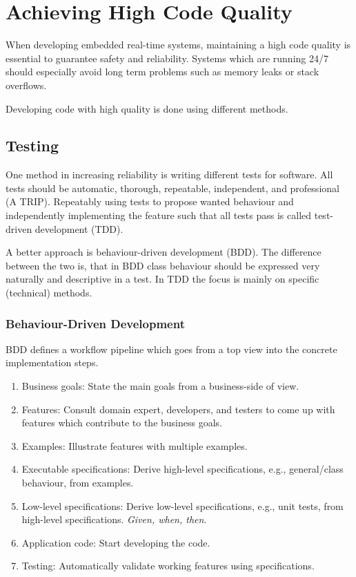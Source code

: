 \section{Achieving High Code Quality}
When developing embedded real-time systems, maintaining a high code quality is essential to guarantee safety and reliability.
Systems which are running 24/7 should especially avoid long term problems such as memory leaks or stack overflows.

Developing code with high quality is done using different methods.

\subsection{Testing}
One method in increasing reliability is writing different tests for software.
All tests should be automatic, thorough, repeatable, independent, and professional (A TRIP).
Repeatably using tests to propose wanted behaviour and independently implementing the feature such that all tests pass is called test-driven development (TDD).

A better approach is behaviour-driven development (BDD).
The difference between the two is, that in BDD class behaviour should be expressed very naturally and descriptive in a test.
In TDD the focus is mainly on specific (technical) methods.

\subsubsection{Behaviour-Driven Development}
BDD defines a workflow pipeline which goes from a top view into the concrete implementation steps.
\begin{enumerate}
    \item Business goals: State the main goals from a business-side of view.

    \item Features: Consult domain expert, developers, and testers to come up with features which contribute to the business goals.

    \item Examples: Illustrate features with multiple examples.

    \item Executable specifications: Derive high-level specifications, e.g., general/class behaviour, from examples.

    \item Low-level specifications: Derive low-level specifications, e.g., unit tests, from high-level specifications. \emph{Given, when, then}.

    \item Application code: Start developing the code.

    \item Testing: Automatically validate working features using specifications.
\end{enumerate}

